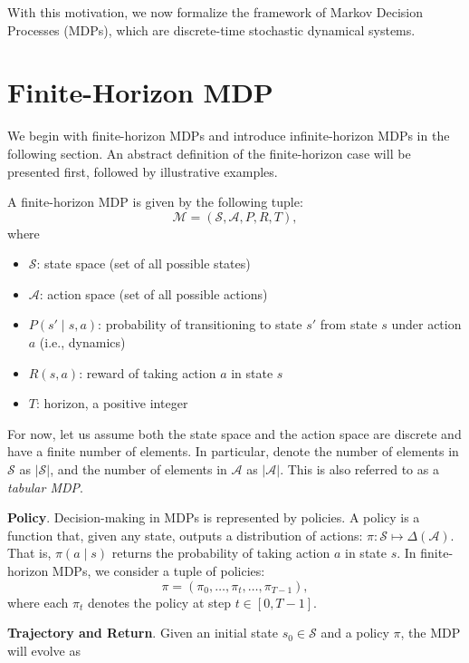 \documentclass[
]{book}
\providecommand{\tightlist}{%
  \setlength{\itemsep}{0pt}\setlength{\parskip}{0pt}}
\theoremstyle{definition}
\theoremstyle{definition}
\theoremstyle{definition}
\theoremstyle{definition}
\theoremstyle{remark}
\begin{document}
With this motivation, we now formalize the framework of Markov Decision Processes (MDPs), which are discrete-time stochastic dynamical systems.

\section{Finite-Horizon MDP}\label{FiniteHorizonMDP}

We begin with finite-horizon MDPs and introduce infinite-horizon MDPs in the following section. An abstract definition of the finite-horizon case will be presented first, followed by illustrative examples.

A finite-horizon MDP is given by the following tuple:
\[
\mathcal{M} = (\mathcal{S}, \mathcal{A}, P, R, T),
\]
where

\begin{itemize}
\tightlist
\item
  \(\mathcal{S}\): state space (set of all possible states)
\item
  \(\mathcal{A}\): action space (set of all possible actions)
\item
  \(P(s' \mid s, a)\): probability of transitioning to state \(s'\) from state \(s\) under action \(a\) (i.e., dynamics)
\item
  \(R(s,a)\): reward of taking action \(a\) in state \(s\)
\item
  \(T\): horizon, a positive integer
\end{itemize}

For now, let us assume both the state space and the action space are discrete and have a finite number of elements. In particular, denote the number of elements in \(\mathcal{S}\) as \(|\mathcal{S}|\), and the number of elements in \(\mathcal{A}\) as \(|\mathcal{A}|\). This is also referred to as a \emph{tabular MDP}.

\textbf{Policy}. Decision-making in MDPs is represented by policies. A policy is a function that, given any state, outputs a distribution of actions: \(\pi: \mathcal{S} \mapsto \Delta(\mathcal{A})\). That is, \(\pi(a \mid s)\) returns the probability of taking action \(a\) in state \(s\). In finite-horizon MDPs, we consider a tuple of policies:
\begin{equation}
\pi = (\pi_0, \dots, \pi_t, \dots, \pi_{T-1}),
\label{eq:policy-tuple}
\end{equation}
where each \(\pi_t\) denotes the policy at step \(t \in [0,T-1]\).

\textbf{Trajectory and Return}. Given an initial state \(s_0 \in \mathcal{S}\) and a policy \(\pi\), the MDP will evolve as
\end{document}
